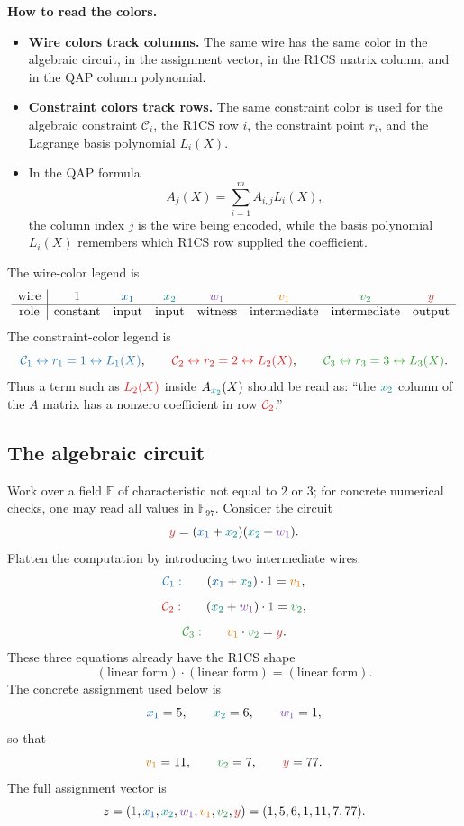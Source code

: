 \documentclass[11pt]{article}
\newcommand{\F}{\mathbb{F}}
\newcommand{\constwire}[1]{\textcolor{wireconstcolor}{#1}}
\newcommand{\xone}[1]{\textcolor{wirexonecolor}{#1}}
\newcommand{\xtwo}[1]{\textcolor{wirextwocolor}{#1}}
\newcommand{\wone}[1]{\textcolor{wirewonecolor}{#1}}
\newcommand{\vone}[1]{\textcolor{wirevonecolor}{#1}}
\newcommand{\vtwo}[1]{\textcolor{wirevtwocolor}{#1}}
\newcommand{\ywire}[1]{\textcolor{wireycolor}{#1}}
\newcommand{\rowone}[1]{\textcolor{rowonecolor}{#1}}
\newcommand{\rowtwo}[1]{\textcolor{rowtwocolor}{#1}}
\newcommand{\rowthree}[1]{\textcolor{rowthreecolor}{#1}}
\begin{document}
\begin{tcolorbox}
\textbf{How to read the colors.}
\begin{itemize}[leftmargin=2em]
    \item \textbf{Wire colors track columns.} The same wire has the same color in the algebraic circuit, in the assignment vector, in the R1CS matrix column, and in the QAP column polynomial.
    \item \textbf{Constraint colors track rows.} The same constraint color is used for the algebraic constraint $\mathcal C_i$, the R1CS row $i$, the constraint point $r_i$, and the Lagrange basis polynomial $L_i(X)$.
    \item In the QAP formula
    \[
        A_j(X)=\sum_{i=1}^{m} A_{i,j} L_i(X),
    \]
    the column index $j$ is the wire being encoded, while the basis polynomial $L_i(X)$ remembers which R1CS row supplied the coefficient.
\end{itemize}
\end{tcolorbox}

The wire-color legend is
\[
\begin{array}{c|ccccccc}
\text{wire} & \constwire{1} & \xone{x_1} & \xtwo{x_2} & \wone{w_1} & \vone{v_1} & \vtwo{v_2} & \ywire{y} \\
\hline
\text{role} & \text{constant} & \text{input} & \text{input} & \text{witness} & \text{intermediate} & \text{intermediate} & \text{output}
\end{array}
\]
The constraint-color legend is
\[
    \rowone{\mathcal C_1\leftrightarrow r_1=1\leftrightarrow L_1(X)},
    \qquad
    \rowtwo{\mathcal C_2\leftrightarrow r_2=2\leftrightarrow L_2(X)},
    \qquad
    \rowthree{\mathcal C_3\leftrightarrow r_3=3\leftrightarrow L_3(X)}.
\]
Thus a term such as $\rowtwo{L_2(X)}$ inside $A_{\xtwo{x_2}}(X)$ should be read as: ``the $\xtwo{x_2}$ column of the $A$ matrix has a nonzero coefficient in row $\rowtwo{\mathcal C_2}$.''

\subsection{The algebraic circuit}

Work over a field $\F$ of characteristic not equal to $2$ or $3$; for concrete numerical checks, one may read all values in $\F_{97}$. Consider the circuit
\[
    \ywire{y}=(\xone{x_1}+\xtwo{x_2})(\xtwo{x_2}+\wone{w_1}).
\]
Flatten the computation by introducing two intermediate wires:
\[
    \rowone{\mathcal C_1:}\qquad
    (\xone{x_1}+\xtwo{x_2})\cdot \constwire{1}=\vone{v_1},
\]
\[
    \rowtwo{\mathcal C_2:}\qquad
    (\xtwo{x_2}+\wone{w_1})\cdot \constwire{1}=\vtwo{v_2},
\]
\[
    \rowthree{\mathcal C_3:}\qquad
    \vone{v_1}\cdot\vtwo{v_2}=\ywire{y}.
\]
These three equations already have the R1CS shape
\[
    (\text{linear form})\cdot(\text{linear form})=(\text{linear form}).
\]
The concrete assignment used below is
\[
    \xone{x_1}=5,
    \qquad
    \xtwo{x_2}=6,
    \qquad
    \wone{w_1}=1,
\]
so that
\[
    \vone{v_1}=11,
    \qquad
    \vtwo{v_2}=7,
    \qquad
    \ywire{y}=77.
\]
The full assignment vector is
\[
    z=(\constwire{1},\xone{x_1},\xtwo{x_2},\wone{w_1},\vone{v_1},\vtwo{v_2},\ywire{y})
      =(1,5,6,1,11,7,77).
\]
\end{document}
